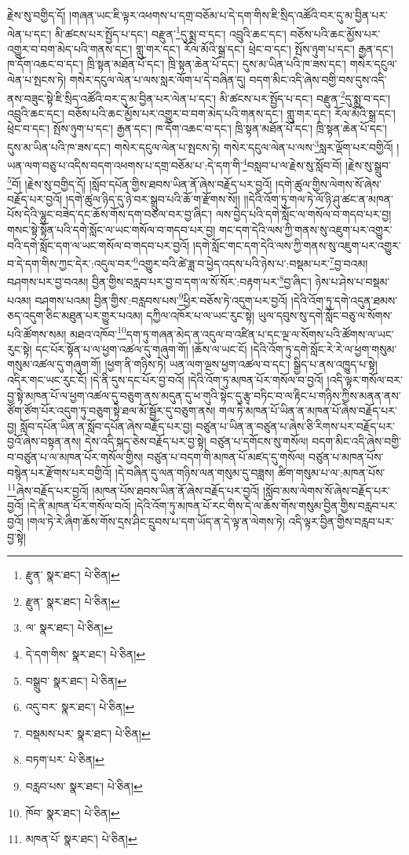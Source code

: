 རྗེས་སུ་བགྱིད་དོ། །གཞན་ཡང་ཇི་ལྟར་འཕགས་པ་དགྲ་བཅོམ་པ་དེ་དག་གིས་ཇི་སྲིད་འཚོའི་བར་དུ་མ་བྱིན་པར་ལེན་པ་དང་། མི་ཚངས་པར་སྤྱོད་པ་དང་། བརྫུན་\footnote{རྫུན་  སྣར་ཐང་།  པེ་ཅིན། }དུ་སྨྲ་བ་དང་། འབྲུའི་ཆང་དང་། བཅོས་པའི་ཆང་མྱོས་པར་འགྱུར་བ་བག་མེད་པའི་གནས་དང་། གླུ་གར་དང་། རོལ་མོའི་སྒྲ་དང་། ཕྲེང་བ་དང་། སྤོས་ཉུག་པ་དང་། རྒྱན་དང་། ཁ་དོག་འཆང་བ་དང་། ཁྲི་སྟན་མཐོན་པོ་དང་། ཁྲི་སྟན་ཆེན་པོ་དང་། དུས་མ་ཡིན་པའི་ཁ་ཟས་དང་། གསེར་དངུལ་ལེན་པ་སྤངས་ཏེ། གསེར་དངུལ་ལེན་པ་ལས་སླར་ལོག་པ་དེ་བཞིན་དུ། བདག་མིང་འདི་ཞེས་བགྱི་བས་དུས་འདི་ནས་བཟུང་སྟེ་ཇི་སྲིད་འཚོའི་བར་དུ་མ་བྱིན་པར་ལེན་པ་དང་། མི་ཚངས་པར་སྤྱོད་པ་དང་། བརྫུན་\footnote{རྫུན་  སྣར་ཐང་།  པེ་ཅིན། }དུ་སྨྲ་བ་དང་། འབྲུའི་ཆང་དང་། བཅོས་པའི་ཆང་མྱོས་པར་འགྱུར་བ་བག་མེད་པའི་གནས་དང་། གླུ་གར་དང་། རོལ་མོའི་སྒྲ་དང་། ཕྲེང་བ་དང་། སྤོས་ཉུག་པ་དང་། རྒྱན་དང་། ཁ་དོག་འཆང་བ་དང་། ཁྲི་སྟན་མཐོན་པོ་དང་། ཁྲི་སྟན་ཆེན་པོ་དང་། དུས་མ་ཡིན་པའི་ཁ་ཟས་དང་། གསེར་དངུལ་ལེན་པ་སྤངས་ཏེ། གསེར་དངུལ་ལེན་པ་ལས་\footnote{ལ་  སྣར་ཐང་།  པེ་ཅིན། }སླར་ལྡོག་པར་བགྱིའོ། །ཡན་ལག་བཅུ་པ་འདིས་བདག་འཕགས་པ་དགྲ་བཅོམ་པ་:དེ་དག་གི་\footnote{དེ་དག་གིས་  སྣར་ཐང་།  པེ་ཅིན། }བསླབ་པ་ལ་རྗེས་སུ་སློབ་བོ། །རྗེས་སུ་སྒྲུབ་\footnote{བསྒྲུབ་  སྣར་ཐང་།  པེ་ཅིན། }བོ། །རྗེས་སུ་བགྱིད་དོ། །སློབ་དཔོན་གྱིས་ཐབས་ཡིན་ནོ་ཞེས་བརྗོད་པར་བྱའོ། །དགེ་ཚུལ་གྱིས་ལེགས་སོ་ཞེས་བརྗོད་པར་བྱའོ། །དགེ་ཚུལ་ཉིད་དུ་ཉེ་བར་སྒྲུབ་པའི་ཆོ་ག་རྫོགས་སོ།། །།དེའི་འོག་ཏུ་གལ་ཏེ་ལོ་ཉི་ཤུ་ཚང་ན་མཁན་པོས་དེའི་ལྷུང་བཟེད་དང་ཆོས་གོས་དག་བཙལ་བར་བྱ་ཞིང་། ལས་བྱེད་པའི་དགེ་སློང་ལ་གསོལ་བ་གདབ་པར་བྱ། གསང་སྟེ་སྟོན་པའི་དགེ་སློང་ལ་ཡང་གསོལ་བ་གདབ་པར་བྱ། གང་དག་དེའི་ལས་ཀྱི་གནས་སུ་འཇུག་པར་འགྱུར་བའི་དགེ་སློང་དག་ལ་ཡང་གསོལ་བ་གདབ་པར་བྱའོ། །དགེ་སློང་གང་དག་དེའི་ལས་ཀྱི་གནས་སུ་འཇུག་པར་འགྱུར་བ་དེ་དག་གིས་ཀྱང་དེར་:འདུལ་བར་\footnote{འདུ་བར་  སྣར་ཐང་།  པེ་ཅིན། }འགྱུར་བའི་ཚེ་ཟླ་བ་ཕྱེད་འདས་པའི་ཉེས་པ་:བསྡམ་པར་\footnote{བསྡམས་པར་  སྣར་ཐང་།  པེ་ཅིན། }བྱ་བའམ། བཤགས་པར་བྱ་བའམ། བྱིན་གྱིས་བརླབ་པར་བྱ་བ་དག་ལ་སོ་སོར་:བརྟག་པར་\footnote{བཏག་པར་  པེ་ཅིན། }བྱ་ཞིང་། ཉེས་པ་ཤེས་པ་བསྡམ་པའམ། བཤགས་པའམ། བྱིན་གྱིས་:བརླབས་པས་\footnote{བརླབ་པས་  སྣར་ཐང་།  པེ་ཅིན། }ཕྱིར་བཅོས་ཏེ་འདུག་པར་བྱའོ། །དེའི་འོག་ཏུ་དགེ་འདུན་ཐམས་ཅད་འདུག་ཅིང་མཐུན་པར་གྱུར་པའམ། དཀྱིལ་འཁོར་པ་ལ་ཡང་རུང་སྟེ། ཡུལ་དབུས་སུ་དགེ་སློང་བཅུ་ལ་སོགས་པའི་ཚོགས་སམ། མཐའ་འཁོབ་\footnote{ཁོབ་  སྣར་ཐང་།  པེ་ཅིན། }དག་ཏུ་གཞན་མེད་ན་འདུལ་བ་འཛིན་པ་དང་ལྔ་ལ་སོགས་པའི་ཚོགས་ལ་ཡང་རུང་སྟེ། དང་པོར་སྟོན་པ་ལ་ཕྱག་འཚལ་དུ་གཞུག་གོ། །ཆོས་ལ་ཡང་ངོ། །དེའི་འོག་ཏུ་དགེ་སློང་རེ་རེ་ལ་ཕྱག་གསུམ་གསུམ་འཚལ་དུ་གཞུག་གོ། །ཕྱག་ནི་གཉིས་ཏེ། ཡན་ལག་ལྔས་ཕྱག་འཚལ་བ་དང་། སྒྱིད་པ་ནས་འཁྱུད་པ་སྟེ། འདིར་གང་ཡང་རུང་ངོ། །དེ་ནི་དུས་དང་པོར་བྱ་བའོ། །དེའི་འོག་ཏུ་མཁན་པོར་གསོལ་བ་བྱའོ། །འདི་ལྟར་གསོལ་བར་བྱ་སྟེ་མཁན་པོ་ལ་ཕྱག་འཚལ་དུ་བཅུག་ནས་མདུན་དུ་ཕ་གུའི་སྟེང་དུ་རྩྭ་བཏིང་བ་ལ་རྟིང་པ་གཉིས་ཀྱིས་མནན་ནས་ཙོག་ཙོག་པོར་འདུག་ཏུ་བཅུག་སྟེ་ཐལ་མོ་སྦྱོར་དུ་བཅུག་ནས། གལ་ཏེ་མཁན་པོ་ཡིན་ན་མཁན་པོ་ཞེས་བརྗོད་པར་བྱ། སློབ་དཔོན་ཡིན་ན་སློབ་དཔོན་ཞེས་བརྗོད་པར་བྱ། བཙུན་པ་ཡིན་ན་བཙུན་པ་ཞེས་ཅི་རིགས་པར་བརྗོད་པར་བྱའོ་ཞེས་བསྟན་ནས། དེས་འདི་སྐད་ཅེས་བརྗོད་པར་བྱ་སྟེ། བཙུན་པ་དགོངས་སུ་གསོལ། བདག་མིང་འདི་ཞེས་བགྱི་བ་བཙུན་པ་ལ་མཁན་པོར་གསོལ་གྱིས། བཙུན་པ་བདག་གི་མཁན་པོ་མཛད་དུ་གསོལ། བཙུན་པ་མཁན་པོས་བསྙེན་པར་རྫོགས་པར་བགྱིའོ། །དེ་བཞིན་དུ་ལན་གཉིས་ལན་གསུམ་དུ་བཟླས། ཚིག་གསུམ་པ་ལ་:མཁན་པོས་\footnote{མཁན་པོ་  སྣར་ཐང་།  པེ་ཅིན། }ཞེས་བརྗོད་པར་བྱའོ། །མཁན་པོས་ཐབས་ཡིན་ནོ་ཞེས་བརྗོད་པར་བྱའོ། །སློབ་མས་ལེགས་སོ་ཞེས་བརྗོད་པར་བྱའོ། །དེ་ནི་མཁན་པོར་གསོལ་བའོ། །དེའི་འོག་ཏུ་མཁན་པོ་རང་གིས་དེ་ལ་ཆོས་གོས་གསུམ་བྱིན་གྱིས་བརླབ་པར་བྱའོ། །གལ་ཏེ་རེ་ཞིག་ཆོས་གོས་དྲས་ཤིང་དྲུབས་པ་དག་ཡོད་ན་དེ་ལྟ་ན་ལེགས་ཏེ། འདི་ལྟར་བྱིན་གྱིས་བརླབ་པར་བྱ་སྟེ། 